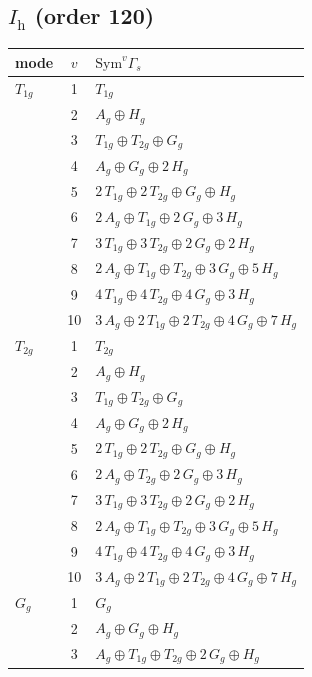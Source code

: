 \documentclass[11pt]{article}
\begin{document}
\subsection*{$I_{\mathrm h}$ \quad (order 120)}
\begin{longtable}{l c p{}}
\hline mode & $v$ & $\mathrm{Sym}^v\Gamma_s$\\ \hline\endhead
$T_{1g}$ & 1 & $T_{1g}$\\
 & 2 & $A_{g}\oplus H_{g}$\\
 & 3 & $T_{1g}\oplus T_{2g}\oplus G_{g}$\\
 & 4 & $A_{g}\oplus G_{g}\oplus 2\,H_{g}$\\
 & 5 & $2\,T_{1g}\oplus 2\,T_{2g}\oplus G_{g}\oplus H_{g}$\\
 & 6 & $2\,A_{g}\oplus T_{1g}\oplus 2\,G_{g}\oplus 3\,H_{g}$\\
 & 7 & $3\,T_{1g}\oplus 3\,T_{2g}\oplus 2\,G_{g}\oplus 2\,H_{g}$\\
 & 8 & $2\,A_{g}\oplus T_{1g}\oplus T_{2g}\oplus 3\,G_{g}\oplus 5\,H_{g}$\\
 & 9 & $4\,T_{1g}\oplus 4\,T_{2g}\oplus 4\,G_{g}\oplus 3\,H_{g}$\\
 & 10 & $3\,A_{g}\oplus 2\,T_{1g}\oplus 2\,T_{2g}\oplus 4\,G_{g}\oplus 7\,H_{g}$\\
\hline
$T_{2g}$ & 1 & $T_{2g}$\\
 & 2 & $A_{g}\oplus H_{g}$\\
 & 3 & $T_{1g}\oplus T_{2g}\oplus G_{g}$\\
 & 4 & $A_{g}\oplus G_{g}\oplus 2\,H_{g}$\\
 & 5 & $2\,T_{1g}\oplus 2\,T_{2g}\oplus G_{g}\oplus H_{g}$\\
 & 6 & $2\,A_{g}\oplus T_{2g}\oplus 2\,G_{g}\oplus 3\,H_{g}$\\
 & 7 & $3\,T_{1g}\oplus 3\,T_{2g}\oplus 2\,G_{g}\oplus 2\,H_{g}$\\
 & 8 & $2\,A_{g}\oplus T_{1g}\oplus T_{2g}\oplus 3\,G_{g}\oplus 5\,H_{g}$\\
 & 9 & $4\,T_{1g}\oplus 4\,T_{2g}\oplus 4\,G_{g}\oplus 3\,H_{g}$\\
 & 10 & $3\,A_{g}\oplus 2\,T_{1g}\oplus 2\,T_{2g}\oplus 4\,G_{g}\oplus 7\,H_{g}$\\
\hline
$G_{g}$ & 1 & $G_{g}$\\
 & 2 & $A_{g}\oplus G_{g}\oplus H_{g}$\\
 & 3 & $A_{g}\oplus T_{1g}\oplus T_{2g}\oplus 2\,G_{g}\oplus H_{g}$\\

\end{longtable}
\end{document}
